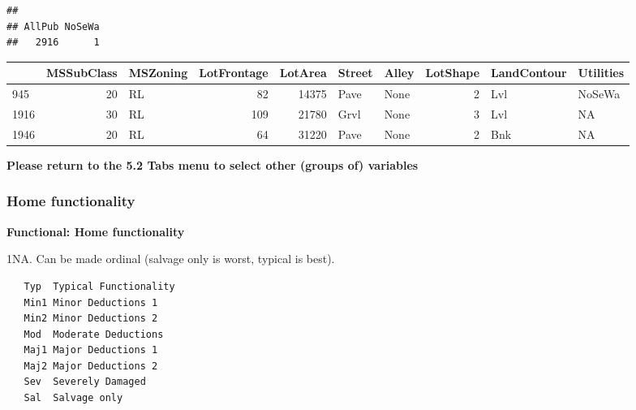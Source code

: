 \documentclass[]{article}
\newenvironment{Shaded}{\begin{snugshade}}{\end{snugshade}}
\newcommand{\KeywordTok}[1]{\textcolor[rgb]{0.13,0.29,0.53}{\textbf{#1}}}
\newcommand{\DecValTok}[1]{\textcolor[rgb]{0.00,0.00,0.81}{#1}}
\newcommand{\StringTok}[1]{\textcolor[rgb]{0.31,0.60,0.02}{#1}}
\newcommand{\OtherTok}[1]{\textcolor[rgb]{0.56,0.35,0.01}{#1}}
\newcommand{\OperatorTok}[1]{\textcolor[rgb]{0.81,0.36,0.00}{\textbf{#1}}}
\newcommand{\NormalTok}[1]{#1}
\begin{document}
\begin{verbatim}
## 
## AllPub NoSeWa 
##   2916      1
\end{verbatim}

\begin{Shaded}
\end{Shaded}

\begin{longtable}[]{@{}lrlrrllrll@{}}
\toprule
& MSSubClass & MSZoning & LotFrontage & LotArea & Street & Alley &
LotShape & LandContour & Utilities\tabularnewline
\midrule
\endhead
945 & 20 & RL & 82 & 14375 & Pave & None & 2 & Lvl &
NoSeWa\tabularnewline
1916 & 30 & RL & 109 & 21780 & Grvl & None & 3 & Lvl & NA\tabularnewline
1946 & 20 & RL & 64 & 31220 & Pave & None & 2 & Bnk & NA\tabularnewline
\bottomrule
\end{longtable}

\begin{Shaded}
\end{Shaded}

\textbf{Please return to the 5.2 Tabs menu to select other (groups of)
variables}

\subsubsection{Home functionality}\label{home-functionality}

\textbf{Functional: Home functionality}

1NA. Can be made ordinal (salvage only is worst, typical is best).

\begin{verbatim}
   Typ  Typical Functionality
   Min1 Minor Deductions 1
   Min2 Minor Deductions 2
   Mod  Moderate Deductions
   Maj1 Major Deductions 1
   Maj2 Major Deductions 2
   Sev  Severely Damaged
   Sal  Salvage only
\end{verbatim}
\end{document}
